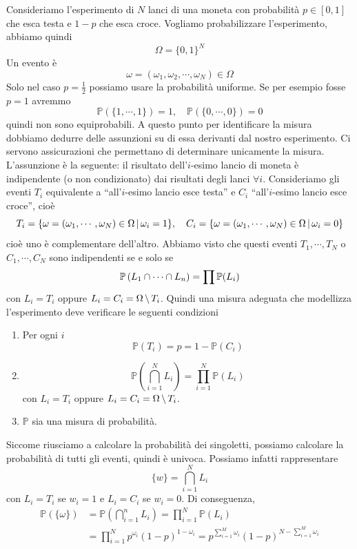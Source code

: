 \documentclass[a4paper]{article}
\begin{document}
Consideriamo l'esperimento di \(N\) lanci di una moneta
con probabilità \(p \in [0,1]\) che esca testa e \(1-p\)
che esca croce. Vogliamo probabilizzare l'esperimento, abbiamo quindi
\[
    \Omega = \{0,1\}^N
\]
Un evento è
\[
    \omega = (\omega_1, \omega_2, \cdots, \omega_N) \in \Omega
\]
Solo nel caso \(p=\frac12\) possiamo usare la probabilità uniforme.
Se per esempio fosse \(p=1\) avremmo
\[
    \mathbb P(\{1, \cdots, 1\}) = 1, \quad
    \mathbb P(\{0, \cdots, 0\}) = 0
\]
quindi non sono equiprobabili.
A questo punto per identificare la misura dobbiamo
dedurre delle assunzioni su di essa derivanti
dal nostro esperimento.
Ci servono assicurazioni che permettano di determinare unicamente la misura.
L'assunzione è la seguente:
il risultato dell'\(i\)-esimo lancio di moneta è indipendente
(o non condizionato) dai risultati degli lanci \(\forall i\).
Consideriamo gli eventi \(T_i\) equivalente a
``all'\(i\)-esimo lancio esce testa''
e \(C_i\) ``all'\(i\)-esimo lancio esce croce'',
cioè
\[
    T_i = \{
        \omega = (\omega_1, \cdots, \omega_N) \in \Omega \,|\,
        \omega_i = 1
    \}, \quad
    C_i = \{
        \omega = (\omega_1, \cdots, \omega_N) \in \Omega \,|\,
        \omega_i = 0
    \}
\]
cioè uno è complementare dell'altro.
Abbiamo visto che questi eventi \(T_1, \cdots, T_N\)
o \(C_1, \cdots, C_N\)
sono indipendenti se e solo se
\[
    \mathbb P \left(
        L_1 \cap \cdots \cap L_n
    \right) = \prod \mathbb P(L_i)
\]
con \(L_i = T_i\) oppure \(L_i = C_i = \Omega \,\backslash\, T_i\).
Quindi una misura adeguata che modellizza l'esperimento
deve verificare le seguenti condizioni
\begin{enumerate}
    \item Per ogni \(i\) \[
            \mathbb P(T_i) = p = 1 - \mathbb P(C_i)
        \]
    \item \[
            \mathbb P \left(
                \bigcap_{i=1}^N L_i
            \right) = \prod_{i=1}^N \mathbb P(L_i)
        \]
        con \(L_i = T_i\) oppure \(L_i = C_i = \Omega \,\backslash\, T_i\).
    \item \(\mathbb P\) sia una misura di probabilità.
\end{enumerate}

Siccome riusciamo a calcolare la probabilità dei singoletti,
possiamo calcolare la probabilità di tutti gli eventi, quindi è univoca.
Possiamo infatti rappresentare
\[
    \{w\} = \bigcap_{i=1}^N L_i
\]
con \(L_i = T_i\) se \(w_i = 1\) e \(L_i = C_i\) se \(w_i = 0\).
Di conseguenza,
\begin{align*}
    \mathbb P(\{\omega\}) &= \mathbb P\left(
        \bigcap_{i=1}^n L_i
    \right) = \prod_{i=1}^N \mathbb P(L_i) \\
    &= \prod_{i=1}^N p^{\omega_i}
    (1-p)^{1-\omega_i} = p^{
        \sum_{i=1}^M \omega_i
    }
    (1-p)^{
        N - \sum_{i=1}^M \omega_i
    }
\end{align*}
\end{document}
